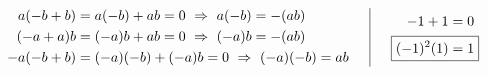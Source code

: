 \documentclass[12pt]{article}
\begin{document}

\vspace{10pt}
\hrulefill
\vspace{10pt}

\(
	\begin{aligned}
		a(-b+b) & = a(-b) + ab = 0 \ \Rightarrow\ a(-b) = -(ab)\\
		(-a+a)b & = (-a)b + ab = 0 \ \Rightarrow\ (-a)b = -(ab)\\
		-a(-b+b) & = (-a)(-b) + (-a)b = 0 \ \Rightarrow\ (-a)(-b) = ab
	\end{aligned}
	\hspace{15pt} \vline \hspace{15pt}
	\begin{aligned}
		-1 + 1 & = 0\\
		\Aboxed{ (-1)^2(1) & = 1 }
	\end{aligned}
\)
\end{document}
